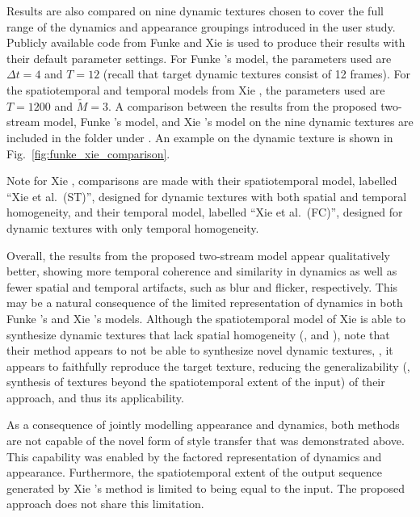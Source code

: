 

Results are also compared on nine dynamic textures chosen to cover the full
range of the dynamics and appearance groupings introduced in the user study.
Publicly available code from Funke \etal and Xie \etal is used to produce their
results with their default parameter settings. For
Funke \etal's model, the parameters used are $\Delta{t}=4$ and
$T=12$ (recall that target dynamic textures
consist of 12 frames). For the spatiotemporal and temporal models from Xie
\etal, the parameters used are $T=1200$ and
$\tilde{M}=3$.
A comparison between the results from the proposed two-stream model, Funke
\etal's model, and Xie \etal's model
on the nine dynamic textures are included in the folder 
under . An example on the  dynamic texture is shown in Fig.\ \ref{fig:funke_xie_comparison}.

Note for Xie \etal, comparisons are made with their
spatiotemporal model, labelled ``Xie et al.\ (ST)'', designed for dynamic
textures with both spatial and temporal homogeneity, and their temporal model,
labelled ``Xie et al.\ (FC)'', designed for dynamic textures with only temporal
homogeneity.

\clearpage

\clearpage

Overall, the results from the proposed two-stream model appear
qualitatively better, showing more temporal coherence and similarity
in dynamics as well as fewer spatial and temporal artifacts, such as blur and flicker, respectively.
This may be a natural consequence of the limited representation of dynamics
in both Funke \etal's and Xie \etal's models. Although the spatiotemporal model
of Xie \etal \cite{xie2017synthesizing} is able to synthesize dynamic textures
that lack spatial homogeneity (\eg,  and ),
note that their method appears to not be able to synthesize novel dynamic textures, \ie, it
appears to faithfully reproduce the target texture, reducing the generalizability (\eg, synthesis of textures beyond the spatiotemporal extent of the input) of their approach, and thus its applicability.
 
As a consequence of jointly modelling appearance and dynamics, both methods \cite{funke2017,xie2017synthesizing} are not capable of the novel form of style
transfer that was demonstrated above. This capability was enabled by the factored
representation of dynamics and appearance. Furthermore, the spatiotemporal
extent of the output sequence generated by Xie \etal's
\cite{xie2017synthesizing} method is limited to being equal to the input.
The proposed approach does not share this limitation.

